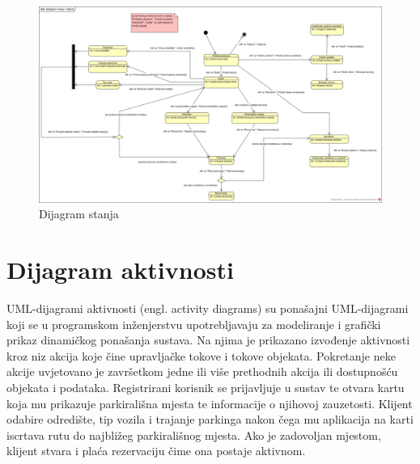\begin{figure}[H]
	\includegraphics[width=\textwidth]{slike/dijagram_stanja.jpg} %
	\centering
	\caption{Dijagram stanja}
	\label{fig:dijagramstanja}
\end{figure}


\eject 

\section{Dijagram aktivnosti}

UML-dijagrami aktivnosti (engl. activity diagrams) su ponašajni UML-dijagrami koji se u programskom inženjerstvu upotrebljavaju za modeliranje i grafički prikaz dinamičkog ponašanja sustava. 
Na njima je prikazano izvođenje aktivnosti kroz niz akcija koje čine upravljačke tokove i tokove objekata. Pokretanje neke akcije uvjetovano je završetkom jedne ili više prethodnih akcija ili dostupnošću objekata i podataka. Registrirani korisnik se prijavljuje u sustav te otvara kartu koja mu prikazuje parkirališna mjesta te informacije o njihovoj zauzetosti. Klijent odabire odredište, tip vozila i trajanje parkinga nakon čega mu aplikacija na karti iscrtava rutu do najbližeg parkirališnog mjesta. Ako je zadovoljan mjestom, klijent stvara i plaća rezervaciju čime ona postaje aktivnom.


